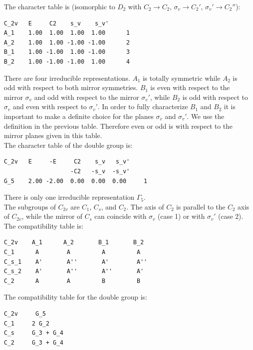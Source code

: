\documentclass[12pt,a4paper]{article}
\begin{document}
The character table is (isomorphic to $D_2$ with $C_2 \rightarrow C_2$,
$\sigma_v \rightarrow C_2'$, $\sigma_v' \rightarrow C_2''$):
\begin{verbatim}
C_2v   E     C2    s_v    s_v'
A_1    1.00  1.00  1.00  1.00      1
A_2    1.00  1.00 -1.00 -1.00      2
B_1    1.00 -1.00  1.00 -1.00      3
B_2    1.00 -1.00 -1.00  1.00      4
\end{verbatim}
There are four irreducible representations. $A_1$ is totally symmetric while
$A_2$ is odd with respect to both mirror symmetries.  
$B_1$ is even with respect to the mirror $\sigma_v$ and odd with respect to
the mirror $\sigma_v'$, while $B_2$ is odd with respect to $\sigma_v$ and even 
with respect to $\sigma_v'$. In order to fully characterize $B_1$ and $B_2$
it is important to make a definite choice for the planes $\sigma_v$ and $\sigma_v'$.
We use the definition in the previous table. Therefore even or odd is with respect
to the mirror planes given in this table. \\
The character table of the double group is:
\begin{verbatim}
C_2v   E     -E     C2    s_v   s_v'
                   -C2   -s_v  -s_v'
G_5    2.00 -2.00  0.00  0.00  0.00     1
\end{verbatim}
There is only one irreducible representation $\Gamma_5$. \\
The subgroups of $C_{2v}$ are $C_1$, $C_s$, and $C_2$. The axis of $C_2$ is 
parallel to the $C_2$ axis of $C_{2v}$, while the mirror of $C_s$ can coincide
with $\sigma_v$ (case 1) or with $\sigma_v'$ (case 2). \\
The compatibility table is:
\begin{verbatim}
C_2v    A_1      A_2       B_1       B_2
C_1      A        A         A         A
C_s_1    A'       A''       A'        A''
C_s_2    A'       A''       A''       A'
C_2      A        A         B         B
\end{verbatim}
The compatibility table for the double group is:
\begin{verbatim}
C_2v     G_5
C_1     2 G_2
C_s     G_3 + G_4
C_2     G_3 + G_4
\end{verbatim}

\newpage
\end{document}
